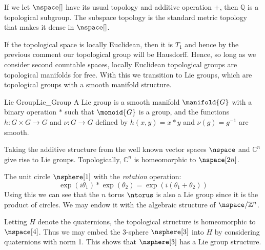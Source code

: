\documentclass{book}                                                            %
\begin{document}
            \begin{example}
                If we let $\nspace[]$ have its usual topology and additive
                operation $+$, then $\mathbb{Q}$ is a topological subgroup. The
                subspace topology is the standard metric topology that makes it
                dense in $\nspace[]$.
            \end{example}
            If the topological space is locally Euclidean, then it is $T_{1}$
            and hence by the previous comment our topological group will be
            Hausdorff. Hence, so long as we consider second countable spaces,
            locally Euclidean topological groups are topological manifolds for
            free. With this we transition to Lie groups, which are topological
            groups with a smooth manifold structure.
            \begin{fdefinition}{Lie Group}{Lie_Group}
                A Lie group is a smooth manifold $\manifold{G}$ with a binary
                operation $*$ such that $\monoid{G}$ is a group, and the
                functions $h:G\times{G}\rightarrow{G}$ and $\nu:G\rightarrow{G}$
                defined by $h(x,y)=x*y$ and $\nu(g)=g^{\minus{1}}$ are smooth.
            \end{fdefinition}
            \begin{example}
                Taking the additive structure from the well known vector spaces
                $\nspace$ and $\mathbb{C}^{n}$ give rise to Lie groups.
                Topologically, $\mathbb{C}^{n}$ is homeomorphic to
                $\nspace[2n]$.
            \end{example}
            \begin{example}
                The unit circle $\nsphere[1]$ with the \textit{rotation}
                operation:
                \begin{equation}
                    \exp(i\theta_{1})*\exp(\theta_{2})
                        =\exp(i(\theta_{1}+\theta_{2}))
                \end{equation}
                Using this we can see that the $n$ torus $\ntorus$ is also a
                Lie group since it is the product of circles. We may endow it
                with the algebraic structure of $\nspace/\mathbb{Z}^{n}$.
            \end{example}
            \begin{example}
                Letting $H$ denote the quaternions, the topological structure is
                homeomorphic to $\nspace[4]$. Thus we may embed the 3-sphere
                $\nsphere[3]$ into $H$ by considering quaternions with norm 1.
                This shows that $\nsphere[3]$ has a Lie group structure.
            \end{example}
\end{document}
